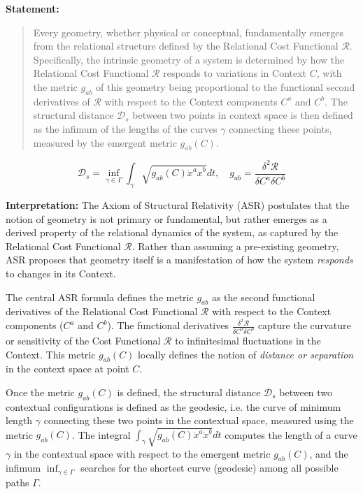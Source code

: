 \documentclass{article}
\begin{document}
\textbf{Statement:}
\begin{quote}
    Every geometry, whether physical or conceptual, fundamentally emerges from the relational structure defined by the Relational Cost Functional $\mathcal{R}$. Specifically, the intrinsic geometry of a system is determined by how the Relational Cost Functional $\mathcal{R}$ responds to variations in Context $C$, with the metric $g_{ab}$ of this geometry being proportional to the functional second derivatives of $\mathcal{R}$ with respect to the Context components $C^a$ and $C^b$. The structural distance $\mathcal{D}_s$ between two points in context space is then defined as the infimum of the lengths of the curves $\gamma$ connecting these points, measured by the emergent metric $g_{ab}(C)$.
\end{quote}


\bigskip

\begin{equation}
\mathcal{D}_s = \inf_{\gamma \in \Gamma} \int_\gamma \sqrt{g_{ab}(C)\dot{x}^a\dot{x}^b} dt,\quad g_{ab} = \frac{\delta^2 \mathcal{R}}{\delta C^a \delta C^b}
\end{equation}

\textbf{Interpretation:} The Axiom of Structural Relativity (ASR) postulates that the notion of geometry is not primary or fundamental, but rather emerges as a derived property of the relational dynamics of the system, as captured by the Relational Cost Functional $\mathcal{R}$. Rather than assuming a pre-existing geometry, ASR proposes that geometry itself is a manifestation of how the system \textit{responds} to changes in its Context.

The central ASR formula defines the metric $g_{ab}$ as the second functional derivatives of the Relational Cost Functional $\mathcal{R}$ with respect to the Context components ($C^a$ and $C^b$). The functional derivatives $\frac{\delta^2 \mathcal{R}}{\delta C^a \delta C^b}$ capture the curvature or sensitivity of the Cost Functional $\mathcal{R}$ to infinitesimal fluctuations in the Context. This metric $g_{ab}(C)$ locally defines the notion of \textit{distance or separation} in the context space at point $C$.

Once the metric $g_{ab}(C)$ is defined, the structural distance $\mathcal{D}_s$ between two contextual configurations is defined as the geodesic, i.e. the curve of minimum length $\gamma$ connecting these two points in the contextual space, measured using the metric $g_{ab}(C)$. The integral $\int_\gamma \sqrt{g_{ab}(C)\dot{x}^a\dot{x}^b} dt$ computes the length of a curve $\gamma$ in the contextual space with respect to the emergent metric $g_{ab}(C)$, and the infimum $\inf_{\gamma \in \Gamma}$ searches for the shortest curve (geodesic) among all possible paths $\Gamma$.
\end{document}
